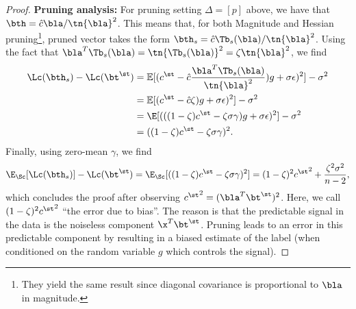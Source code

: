 \begin{proof}
\noindent \textbf{Pruning analysis:} For pruning setting $\Delta=[p]$ above, we have that $\bth=\hat{c}\bla/\tn{\bla}^2$. This means that, for both Magnitude and Hessian pruning\footnote{They yield the same result since diagonal covariance is proportional to $\bla$ in magnitude.}, pruned vector takes the form $\bth_s=\hat{c}\Tb_s(\bla)/\tn{\bla}^2$. Using the fact that $\bla^T\Tb_s(\bla)=\tn{\Tb_s(\bla)}^2=\zeta\tn{\bla}^2$, we find
\begin{align}
\Lc(\bth_s)-\Lc(\bt^\st)&=\mathbb{E}[(c^\st- \hat{c}\frac{\bla^T\Tb_s(\bla)}{\tn{\bla}^2})g+\sigma\epsilon)^2]-\sigma^2\\
&=\mathbb{E}[(c^\st- \hat{c}\zeta)g+\sigma\epsilon)^2]-\sigma^2\\
&=\E[(((1-\zeta)c^\st-\zeta\sigma\gamma)g+\sigma\epsilon)^2]-\sigma^2\\
&=((1-\zeta)c^\st-\zeta\sigma\gamma)^2.
\end{align}
Finally, using zero-mean $\gamma$, we find
\[
\E_{\Sc}[\Lc(\bth_s)]-\Lc(\bt^\st)=\E_{\Sc}[((1-\zeta)c^\st-\zeta\sigma\gamma)^2]=(1-\zeta)^2{c^\st}^2+\frac{\zeta^2\sigma^2}{n-2},
\]
which concludes the proof after observing ${c^\st}^2=(\bla^T\bt^\st)^2$. Here, we call $(1-\zeta)^2{c^\st}^2$ ``the error due to bias''. The reason is that the predictable signal in the data is the noiseless component $\x^T\bt^\st$. Pruning leads to an error in this predictable component by resulting in a biased estimate of the label (when conditioned on the random variable $g$ which controls the signal).
\end{proof}
